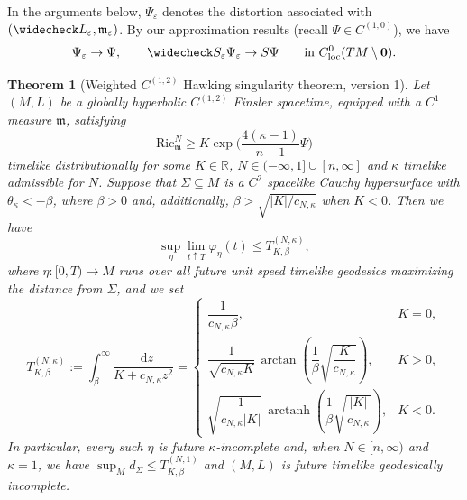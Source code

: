 \documentclass[a4paper,11pt]{article}
\numberwithin{equation}{section}
\theoremstyle{definition}
\theoremstyle{plain}
\newtheorem{Theorem}[Definition]{Theorem}
\newcommand{\R}{\mathbb R}
\newcommand{\Ric}{\mathrm{Ric}}
\newcommand{\m}{\mathfrak m}
\newcommand*\diff{\mathop{}\!\mathrm{d}}
\begin{document}
In the arguments below, $\Psi_\varepsilon$ denotes the distortion associated with $(\widecheck L_\varepsilon,\mathfrak m_\varepsilon)$. 
By our approximation results (recall $\Psi \in C^{(1,0)}$), we have
\begin{equation*}
    \Psi_\varepsilon\to\Psi,
    \qquad
    \widecheck S_\varepsilon\Psi_\varepsilon\to S\Psi \qquad \text{in } C^0_{\mathrm{loc}}(TM\setminus \mathbf 0).
\end{equation*}


\begin{Theorem}[Weighted $C^{(1,2)}$ Hawking singularity theorem, version 1]
\label{theorem: weighted hawking 1}
Let $(M,L)$ be a globally hyperbolic $C^{(1,2)}$ Finsler spacetime, equipped with a $C^1$ measure $\mathfrak m$, satisfying 
\[
\Ric^N_\m \geq K\exp\biggl( \frac{4(\kappa-1)}{n-1}\Psi \biggr)
\]
timelike distributionally for some $K\in\R$, $N \in (-\infty,1] \cup [n,\infty]$ and $\kappa$ timelike admissible for $N$.
Suppose that $\Sigma\subseteq M$ is a $C^2$ spacelike Cauchy hypersurface with $\theta_\kappa <-\beta$,
where $\beta>0$ and, additionally, $\beta>\sqrt{|K|/c_{N,\kappa}}$
when $K<0$.
Then we have
\[
\sup_\eta \lim_{t \uparrow T} \varphi_\eta(t) \leq T^{(N,\kappa)}_{K,\beta},
\]
where $\eta:[0,T) \to M$ runs over all future unit speed timelike geodesics maximizing the distance from $\Sigma$, and we set 
\[
    T^{(N,\kappa)}_{K,\beta}
    :=
    \int_\beta^\infty
        \frac{\diff z}{K+c_{N,\kappa}z^2}
    =
    \begin{cases}
        \dfrac{1}{c_{N,\kappa}\beta},
        & K=0,\\[1.2ex]
        \dfrac{1}{\sqrt{c_{N,\kappa}K}}\,
        \arctan\!\left(
            \dfrac{1}{\beta}\sqrt{\dfrac{K}{c_{N,\kappa}}}
        \right),
        & K>0,\\[1.6ex]
        \sqrt{\dfrac{1}{c_{N,\kappa}|K|}}\,
        \operatorname{arctanh}\!\left(
            \dfrac{1}{\beta}\sqrt{\dfrac{|K|}{c_{N,\kappa}}}
        \right),
        & K<0.
    \end{cases}
\]
In particular, every such $\eta$ is future $\kappa$-incomplete and, when $N \in [n,\infty)$ and $\kappa=1$, we have $\sup_M d_\Sigma \le T^{(N,1)}_{K,\beta}$ and $(M,L)$ is future timelike geodesically incomplete.
\end{Theorem}
\end{document}
